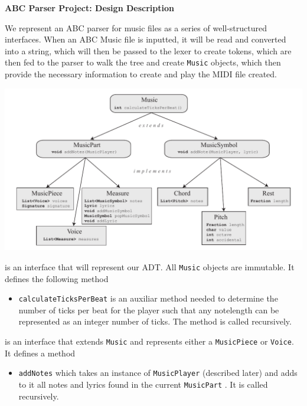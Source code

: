 \documentclass[12pt]{book}
\begin{document}
\phantom{xxx}
\bigskip
\centerline{{\large \bf ABC Parser Project: Design Description }}
\bigskip\bigskip


We represent an ABC parser for music files as a series of well-structured interfaces. When an ABC Music file is inputted, it will be read and converted into a string, which will then be passed to the lexer to create tokens, which are then fed to the parser to walk the tree and create {\tt Music} objects, which then provide the necessary information to create and play the MIDI file created.

\centerline{ \includegraphics{Music.pdf}}

 is an interface that will represent our ADT. All {\tt Music} objects are immutable. It defines the following method

\begin{itemize} 

\item { \tt calculateTicksPerBeat} is an auxiliar method needed to determine the number of ticks per beat for the player such that any notelength can be represented as an integer number of ticks. The method is called recursively.
\end{itemize}

\medskip 

 is an interface that extends {\tt Music} and represents either a {\tt MusicPiece} or {\tt Voice}.  It defines a method
\begin{itemize} 
\item { \tt addNotes} which takes an instance of  {\tt MusicPlayer} (described later) and adds to it all notes and lyrics found in the current {\tt MusicPart}  . It is called recursively.
\end{itemize}
\end{document}
